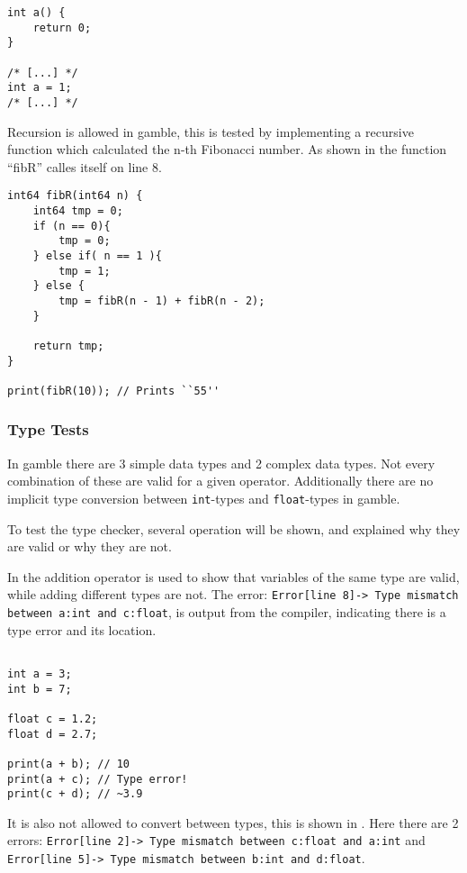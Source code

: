 \begin{lstlisting}[caption={Example of a redeclaration error in \gls{gamble}},label={lst:scope5},frame=tb]
int a() {
    return 0;
}

/* [...] */
int a = 1;
/* [...] */
\end{lstlisting}

Recursion is allowed in \gls{gamble}, this is tested by implementing a recursive function which calculated the n-th Fibonacci number.
As shown in  the function ``fibR'' calles itself on line 8.

\begin{lstlisting}[caption={Recursive Fibonacci in \gls{gamble}},label={lst:fibR},frame=tb]
int64 fibR(int64 n) {
    int64 tmp = 0;
    if (n == 0){
        tmp = 0;
    } else if( n == 1 ){
        tmp = 1;
    } else {
        tmp = fibR(n - 1) + fibR(n - 2);
    }

    return tmp;
}

print(fibR(10)); // Prints ``55''
\end{lstlisting}

\subsubsection*{Type Tests}
In \gls{gamble} there are 3 simple data types and 2 complex data types.
Not every combination of these are valid for a given operator.
Additionally there are no implicit type conversion between \texttt{int}-types and \texttt{float}-types in \gls{gamble}.

To test the type checker, several operation will be shown, and explained why they are valid or why they are not.

In  the addition operator is used to show that variables of the same type are valid, while adding different types are not.
The error: \texttt{Error[line    8]-> Type mismatch between a:int and c:float}, is output from the compiler, indicating there is a type error and its location.
\begin{lstlisting}[caption={Addition in \gls{gamble} to demonstrate the type checker.},label={lst:type1},frame=tb]

int a = 3;
int b = 7;

float c = 1.2;
float d = 2.7;

print(a + b); // 10
print(a + c); // Type error!
print(c + d); // ~3.9
\end{lstlisting}

It is also not allowed to convert between types, this is shown in .
Here there are 2 errors: \texttt{Error[line    2]-> Type mismatch between c:float and a:int} and \texttt{Error[line    5]-> Type mismatch between b:int and d:float}.

